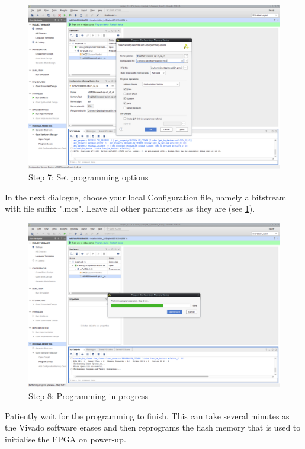 \begin{figure}
  \includegraphics[width=\linewidth]{images/vivado07.png}
  \caption{Step 7: Set programming options}
  \label{fig:vivado07}
\end{figure}

In the next dialogue, choose your local Configuration file, namely a bitstream with file suffix ".mcs". Leave all other parameters as they are (see \ref{fig:vivado07}).

\begin{figure}
  \includegraphics[width=\linewidth]{images/vivado08.png}
  \caption{Step 8: Programming in progress}
  \label{fig:vivado08}
\end{figure}

Patiently wait for the programming to finish. This can take several minutes as the Vivado software erases and then reprograms
the flash memory that is used to initialise the FPGA on power-up.

